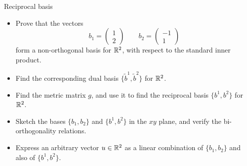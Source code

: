 \documentclass[11pt]{article}
\begin{document}






\begin{exercise} 
    Reciprocal basis

    \begin{itemize}
        \item Prove that the vectors
        \[
            b_1 = 
          \begin{pmatrix}
            1 \\ 2
          \end{pmatrix} 
          \qquad
            b_2 =
            \begin{pmatrix}
                -1 \\ 1
            \end{pmatrix}
        \]
        form a non-orthogonal basis for $\mathbb R^2$, with respect to the standard
        inner product.
        \item Find the corresponding dual basis $\{\tilde{b}^1, \tilde{b}^2\}$ for $\mathbb R^2$.
        \item Find the metric matrix $g$, and use it to find the reciprocal basis $\{b^1,b^2\}$ for $\mathbb R^2$.
        \item Sketch the bases $\{b_1,b_2\}$ and $\{b^1,b^2\}$  in the $xy$ plane, and verify the bi-orthogonality relations.
        \item Express an arbitrary vector $u\in \mathbb R^2$ as a linear combination of
        $\{b_1,b_2\}$ and also of $\{b^1,b^2\}$.
    \end{itemize}
    
\end{exercise}
\end{document}
